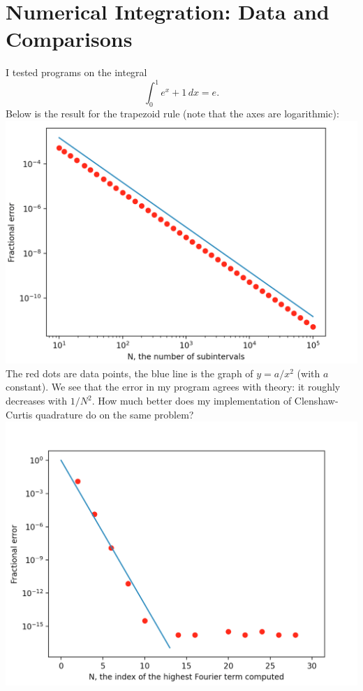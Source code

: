 \documentclass[11pt]{article}
\theoremstyle{plain}
\begin{document}
\section{Numerical Integration: Data and Comparisons}
I tested programs on the integral
\begin{equation*}
	\int_0^1 e^x + 1 \, dx = e.
\end{equation*}
Below is the result for the trapezoid rule (note that the axes are logarithmic): \\
\includegraphics[scale=0.5]{trapezoiddata}
\\ The red dots are data points, the blue line is the graph of $y = a/x^2$ (with $a$ constant). We see that the error in my program agrees with theory: it roughly decreases with $1/N^2$. How much better does my implementation of Clenshaw-Curtis quadrature do on the same problem? \\
\includegraphics[scale=0.5]{ccdata}
\end{document}
